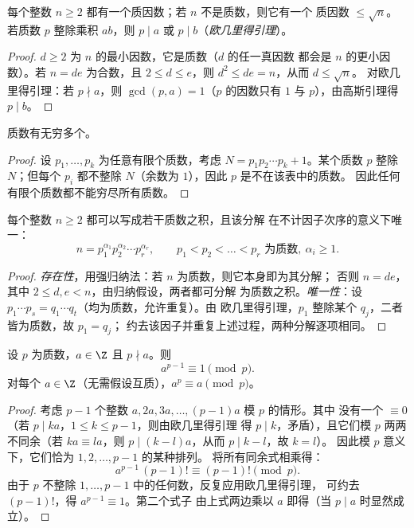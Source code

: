 \begin{proposition}\label{prop:g12:arith:primedivides}
每个整数 $n \geq 2$ 都有一个质因数；若 $n$ 不是质数，则它有一个
质因数 $\leq \sqrt n$。若质数 $p$ 整除乘积 $ab$，则
$p \mid a$ 或 $p \mid b$（\emph{欧几里得引理}）。
\end{proposition}

\begin{proof}
$d \geq 2$ 为 $n$ 的最小因数，它是质数（$d$ 的任一真因数
都会是 $n$ 的更小因数）。若 $n = de$ 为合数，且
$2 \leq d \leq e$，则 $d^2 \leq de = n$，从而 $d \leq \sqrt n$。
对欧几里得引理：若 $p \nmid a$，则 $\gcd(p, a) = 1$（$p$ 的因数只有
$1$ 与 $p$），由高斯引理得 $p \mid b$。
\end{proof}

\begin{theorem}[欧几里得]\label{thm:g12:arith:infiniteprimes}
质数有无穷多个。
\end{theorem}

\begin{proof}
设 $p_1, \dots, p_k$ 为任意有限个质数，考虑
$N = p_1 p_2 \cdots p_k + 1$。某个质数 $p$ 整除 $N$；但每个 $p_i$
都不整除 $N$（余数为 $1$），因此 $p$ 是不在该表中的质数。
因此任何有限个质数都不能穷尽所有质数。
\end{proof}

\begin{theorem}[算术基本定理]\label{thm:g12:arith:fta}
每个整数 $n \geq 2$ 都可以写成若干质数之积，且该分解
在不计因子次序的意义下唯一：
\[
n = p_1^{\alpha_1} p_2^{\alpha_2} \cdots p_r^{\alpha_r},
\qquad p_1 < p_2 < \dots < p_r \text{ 为质数},\ \alpha_i \geq 1 .
\]
\end{theorem}

\begin{proof}
\emph{存在性}，用强归纳法：若 $n$ 为质数，则它本身即为其分解；
否则 $n = de$，其中 $2 \leq d, e < n$，由归纳假设，两者都可分解
为质数之积。\emph{唯一性}：设
$p_1\cdots p_s = q_1 \cdots q_t$（均为质数，允许重复）。由
欧几里得引理，$p_1$ 整除某个 $q_j$，二者皆为质数，故 $p_1 = q_j$；
约去该因子并重复上述过程，两种分解逐项相同。
\end{proof}

\begin{theorem}[费马小定理]\label{thm:g12:arith:fermat}
设 $p$ 为质数，$a \in \Z$ 且 $p \nmid a$。则
\[
a^{p-1} \equiv 1 \pmod p .
\]
对每个 $a \in \Z$（无需假设互质），$a^p \equiv a \pmod p$。
\end{theorem}

\begin{proof}
考虑 $p - 1$ 个整数 $a, 2a, 3a, \dots, (p-1)a$ 模 $p$ 的情形。其中
没有一个 $\equiv 0$（若 $p \mid ka$，$1 \leq k \leq p-1$，则由欧几里得引理
得 $p \mid k$，矛盾），且它们模 $p$ 两两不同余（若
$ka \equiv la$，则 $p \mid (k - l)a$，从而 $p \mid k - l$，故 $k = l$）。
因此模 $p$ 意义下，它们恰为 $1, 2, \dots, p-1$ 的某种排列。
将所有同余式相乘得：
\[
a^{p-1}\,(p-1)! \equiv (p-1)! \pmod p .
\]
由于 $p$ 不整除 $1, \dots, p-1$ 中的任何数，反复应用欧几里得引理，
可约去 $(p-1)!$，得 $a^{p-1} \equiv 1$。第二个式子
由上式两边乘以 $a$ 即得（当 $p \mid a$ 时显然成立）。
\end{proof}

